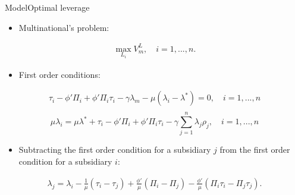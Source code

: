 \documentclass{beamer}
\begin{document}
\begin{frame}{Model}{Optimal leverage}
\begin{itemize}
	\item  Multinational's problem:
\end{itemize}
	\begin{equation}
\begin{aligned}
\max_{L_i}V_m^L, \quad i=1,...,n.
\end{aligned}
\label{eq:problem}
\end{equation}
\begin{itemize}
	\item  First order conditions:
\end{itemize}
\begin{equation}
\begin{aligned}
\tau_i-\phi'\Pi_i+\phi'\Pi_i\tau_{i}-\gamma\lambda_m-\mu(\lambda_i-\lambda^*)=0, \quad i=1,...,n\\
\end{aligned}
\label{eq:FOC}
\end{equation}
\begin{equation}
\mu\lambda_i=\mu\lambda^*+\tau_{i}-\phi'\Pi_i+\phi'\Pi_i\tau_{i}-\gamma \sum_{j=1}^{n}\lambda_j\rho_j, \quad i=1,...,n
\label{eq:FOC2}
\end{equation}
\begin{itemize}
	\item Subtracting the first order condition for a subsidiary $j$ from the first order condition for a subsidiary $i$:
\end{itemize}
\begin{equation}
\begin{aligned}
\lambda_j=\lambda_i-\frac{1}{\mu}(\tau_i-\tau_j)+\frac{\phi'}{\mu}(\Pi_i-\Pi_j)-\frac{\phi'}{\mu}(\Pi_i\tau_i-\Pi_j\tau_j).
\end{aligned}
\label{eq:joint FOC}
\end{equation}
\end{frame}
\end{document}
